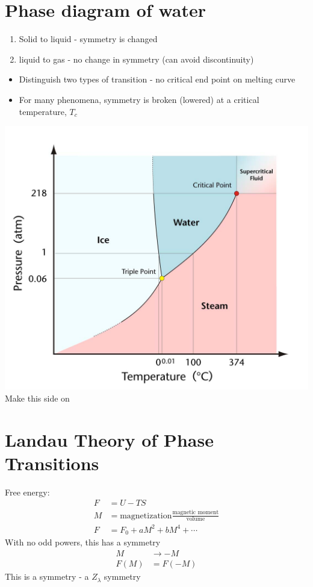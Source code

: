 \documentclass[a4paper, 11pt, normalem]{report}
\begin{document}
\section{Phase diagram of water}
\begin{enumerate}
    \item Solid to liquid - symmetry is changed
    \item liquid to gas - no change in symmetry (can avoid discontinuity)
\end{enumerate}
\begin{itemize}
    \item Distinguish two types of transition - no critical end point on melting curve
    \item For many phenomena, symmetry is broken (lowered) at a critical temperature, $T_c$
\end{itemize}
\includegraphics[scale=0.5]{water.png}
Make this side on

\section{Landau Theory of Phase Transitions}
Free energy: 
\begin{align}
    F &= U - TS \\
    M &= \text{magnetization}\frac{\text{magnetic moment}}{\text{volume}} \\
    F &= F_0 + aM^2 + bM^4 + \cdots
\end{align}
With no odd powers, this has a symmetry
\begin{align}
    M &\to -M \\
    F(M) &= F(-M)
\end{align}
This is a symmetry - a $Z_{\lambda}$ symmetry
\end{document}
